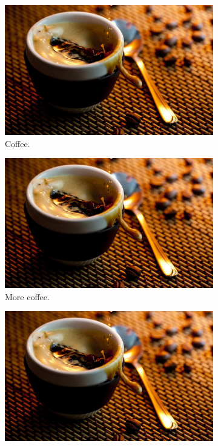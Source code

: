 \documentclass[11pt]{article}  %
\begin{document}
      \begin{figure}[h!]
        \centering
        \begin{subfigure}[h]{0.2\linewidth}
          \includegraphics[width=\linewidth]{../resources/coffee.jpg}
          \caption{Coffee.}
        \end{subfigure}
        \begin{subfigure}[h]{0.2\linewidth}
          \includegraphics[width=\linewidth]{../resources/coffee.jpg}
          \caption{More coffee.}
        \end{subfigure}
        \begin{subfigure}[h]{0.2\linewidth}
          \includegraphics[width=\linewidth]{../resources/coffee.jpg}

\end{subfigure}
\end{figure}
\end{document}
